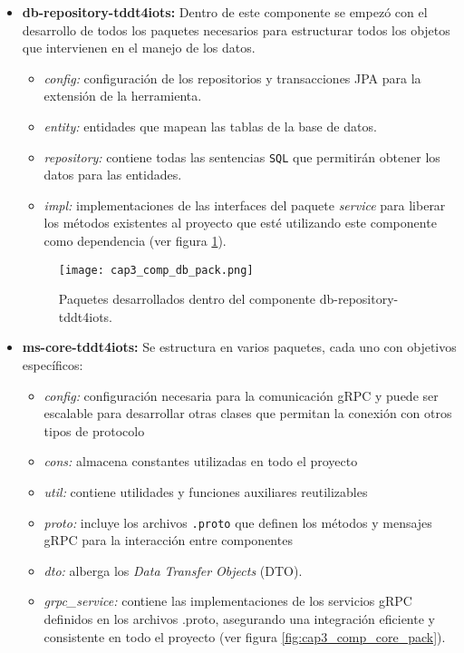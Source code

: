 \begin{itemize}
	\item \textbf{db-repository-tddt4iots: } Dentro de este componente se empezó con el desarrollo de todos los paquetes necesarios para estructurar todos los objetos que intervienen en el manejo de los datos. 
	
	\begin{itemize}
		\item \textit{config:} configuración de los repositorios y transacciones JPA para la extensión de la herramienta.
		
		\item \textit{entity:} entidades que mapean las tablas de la base de datos.
		
		\item \textit{repository: } contiene todas las sentencias \texttt{SQL} que permitirán obtener los datos para las entidades.
		
		\item \textit{impl: } implementaciones de las interfaces del paquete \textit{service} para liberar los métodos existentes al proyecto que esté utilizando este componente como dependencia (ver figura \ref{fig:cap3_comp_db_pack}).
	\end{itemize}

	
	\begin{figure}[H]
		\centering
		\texttt{[image: cap3\_comp\_db\_pack.png]}
		\caption{Paquetes desarrollados dentro del componente db-repository-tddt4iots.}
		\label{fig:cap3_comp_db_pack}
	\end{figure}
	
	\item \textbf{ms-core-tddt4iots: } Se estructura en varios paquetes, cada uno con objetivos específicos: 
	
	\begin{itemize}
		\item \textit{config: } configuración necesaria para la comunicación gRPC y puede ser escalable para desarrollar otras clases que permitan la conexión con otros tipos de protocolo
		\item \textit{cons: } almacena constantes utilizadas en todo el proyecto
		\item \textit{util: } contiene utilidades y funciones auxiliares reutilizables
		\item \textit{proto: } incluye los archivos \texttt{.proto} que definen los métodos y mensajes gRPC para la interacción entre componentes
		\item \textit{dto: } alberga los \textit{Data Transfer Objects} (DTO).
		\item \textit{grpc\_service: } contiene las implementaciones de los servicios gRPC definidos en los archivos .proto, asegurando una integración eficiente y consistente en todo el proyecto (ver figura \ref{fig:cap3_comp_core_pack}).
	\end{itemize}


\end{itemize}
